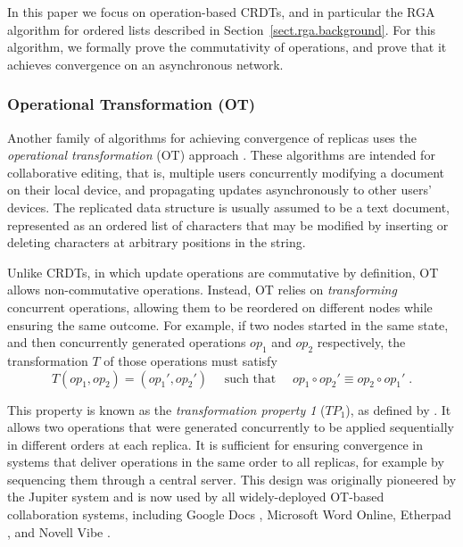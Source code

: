 In this paper we focus on operation-based CRDTs, and in particular the RGA algorithm for ordered
lists described in Section~\ref{sect.rga.background}. For this algorithm, we formally prove the
commutativity of operations, and prove that it achieves convergence on an asynchronous network.

\subsubsection{Operational Transformation (OT)}

Another family of algorithms for achieving convergence of replicas uses the \emph{operational
transformation} (OT) approach
\cite{Ellis:1989ue,Ressel:1996wx,Oster:2006tr,Sun:1998vf,Sun:1998un,Suleiman:1998eu,Nichols:1995fd}.
These algorithms are intended for collaborative editing, that is, multiple users concurrently
modifying a document on their local device, and propagating updates asynchronously to other users'
devices. The replicated data structure is usually assumed to be a text document, represented as an
ordered list of characters that may be modified by inserting or deleting characters at arbitrary
positions in the string.

Unlike CRDTs, in which update operations are commutative by definition, OT allows non-commutative
operations. Instead, OT relies on \emph{transforming} concurrent operations, allowing them to be
reordered on different nodes while ensuring the same outcome. For example, if two nodes started in
the same state, and then concurrently generated operations $\mathit{op}_1$ and $\mathit{op}_2$
respectively, the transformation $T$ of those operations must satisfy
\[
  T(\mathit{op}_1, \mathit{op}_2) = (\mathit{op}_1', \mathit{op}_2') \quad\text{ such that }\quad
  \mathit{op}_1 \circ \mathit{op}_2' \equiv \mathit{op}_2 \circ \mathit{op}_1' \;.
\]

This property is known as the \emph{transformation property 1} ($\mathit{TP}_1$), as defined by
\citet{Ressel:1996wx}. It allows two operations that were generated concurrently to be applied
sequentially in different orders at each replica. It is sufficient for ensuring convergence in
systems that deliver operations in the same order to all replicas, for example by sequencing them
through a central server. This design was originally pioneered by the Jupiter system
\cite{Nichols:1995fd} and is now used by all widely-deployed OT-based collaboration systems,
including Google Docs \cite{DayRichter:2010tt}, Microsoft Word Online, Etherpad
\cite{Etherpad:2011um}, and Novell Vibe \cite{Spiewak:2010vw}.

